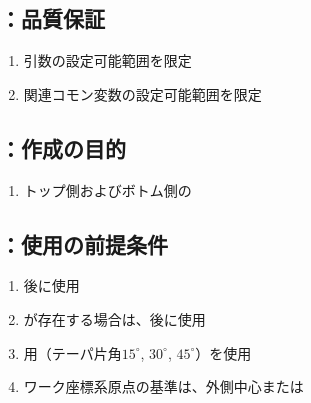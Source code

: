 \subsection{\KEndFaceOutCChamferRLeft：品質保証}
\begin{enumerate}[label*=\sarrow]
\item {}引数の設定可能範囲を限定
\item 関連コモン変数の設定可能範囲を限定
\end{enumerate}



\clearrightpage


\subsection{\KEndFaceOutCChamferRLeft：作成の目的}
\begin{enumerate}[label*=\sarrow]
\item トップ側およびボトム側の\EndFaceOutCChamferMilling
\end{enumerate}


\subsection{\KEndFaceOutCChamferRLeft：使用の前提条件}
\begin{enumerate}[label*=\sarrow]
\item \EndFacecutMilling 後に使用
\item \Outcut が存在する場合は、\OutcutMilling 後に使用
\item \EndFaceCChamferMilling 用\TaperEndMill（テーパ片角$15^\circ$, $30^\circ$, $45^\circ$）を使用
\item {}ワーク座標系原点の基準は、\EndFace 外側中心または\OutcutCenter
\end{enumerate}


